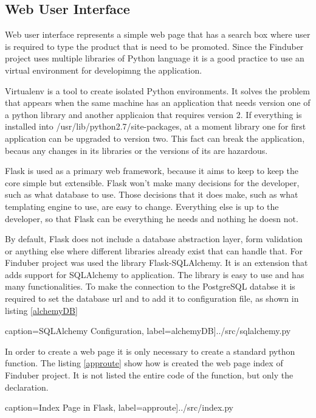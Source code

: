 \subsection{Web User Interface}

Web user interface represents a simple web page that has a search box where user is required to type the product that is need to be promoted. Since the Finduber project uses multiple libraries of Python language it is a good practice to use an virtual environment for developimng the application.

Virtualenv is a tool to create isolated Python environments. It solves the problem that appears when the same machine has an application that needs version one of a python library and another applicaion that requires version 2. If everything is installed into 
/usr/lib/python2.7/site-packages, at a moment library one for first application can be upgraded to version two. This fact can break the application, becaus any changes in its libraries or the versions of its are hazardous. 

Flask is used as a primary web framework, because it aims to keep to keep the core simple but extensible. Flask won’t make many decisions for the developer, such as what database to use. Those decisions that it does make, such as what templating engine to use, are easy to change. Everything else is up to the developer, so that Flask can be everything he needs and nothing he doesn not.

By default, Flask does not include a database abstraction layer, form validation or anything else where different libraries already exist that can handle that. For Finduber project was used the library Flask-SQLAlchemy. It is an extension that adds support for SQLAlchemy to application. The library is easy to use and has many functionalities. To make the connection to the PostgreSQL databse it is required to set the database url and to add it to configuration file, as shown in listing \ref{alchemyDB}

 caption={SQLAlchemy Configuration}, label=alchemyDB]{../src/sqlalchemy.py}

In order to create a web page it is only necessary to create a standard python function. The listing \ref{approute} show how is created the web page index of Finduber project. It is not listed the entire code of the function, but only the declaration.

 caption={Index Page in Flask}, label=approute]{../src/index.py}

